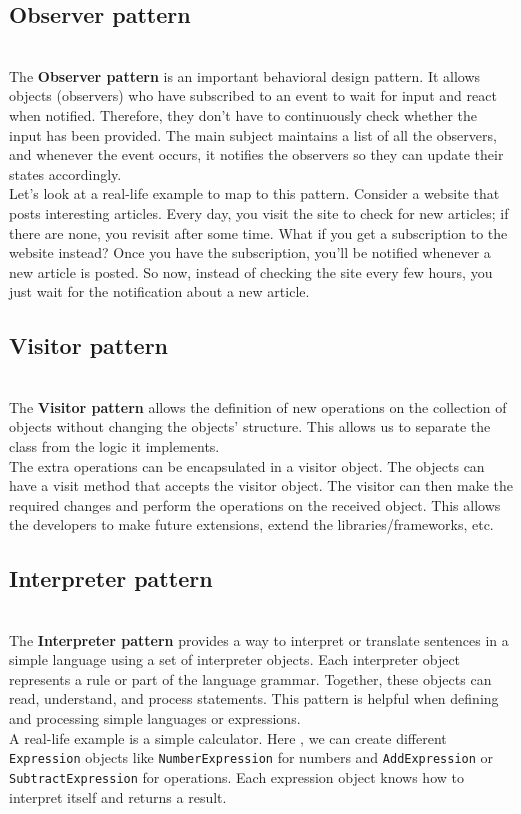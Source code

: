 \subsection{Observer pattern}\label{nJWyih8BoOtDGtLNh4Y1a}
\\
The \textbf{Observer pattern} is an important behavioral design pattern. It allows objects (observers) who have subscribed to an event to wait for input and react when notified. Therefore, they don't have to continuously check whether the input has been provided. The main subject maintains a list of all the observers, and whenever the event occurs, it notifies the observers so they can update their states accordingly.
\\
Let's look at a real-life example to map to this pattern. Consider a website that posts interesting articles. Every day, you visit the site to check for new articles; if there are none, you revisit after some time. What if you get a subscription to the website instead? Once you have the subscription, you'll be notified whenever a new article is posted. So now, instead of checking the site every few hours, you just wait for the notification about a new article.

\subsection{Visitor pattern}\label{-Vh30QfY21ofCt-DrloW9}
\\
The \textbf{Visitor pattern} allows the definition of new operations on the collection of objects without changing the objects' structure. This allows us to separate the class from the logic it implements.
\\
The extra operations can be encapsulated in a visitor object. The objects can have a visit method that accepts the visitor object. The visitor can then make the required changes and perform the operations on the received object. This allows the developers to make future extensions, extend the libraries/frameworks, etc.

\subsection{Interpreter pattern}\label{o0ok-Ki2ejHM8Dg0sMstK}
\\
The \textbf{Interpreter pattern} provides a way to interpret or translate sentences in a simple language using a set of interpreter objects. Each interpreter object represents a rule or part of the language grammar. Together, these objects can read, understand, and process statements. This pattern is helpful when defining and processing simple languages or expressions.
\\
A real-life example is a simple calculator. Here , we can create different \texttt{Expression} objects like \texttt{NumberExpression} for numbers and \texttt{AddExpression} or \texttt{SubtractExpression} for operations. Each expression object knows how to interpret itself and returns a result.

